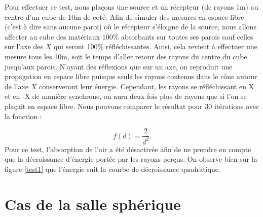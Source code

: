 Pour effectuer ce test, nous plaçons une source et un récepteur (de rayons 1m) au centre d'un cube de 10m de coté. Afin de simuler des mesures en espace libre (c'est à dire sans aucune paroi) où le récepteur s'éloigne de la source, nous allons affecter au cube des matériaux $100\%$ absorbants sur toutes ses parois sauf celles sur l'axe des $X$ qui seront 100\% réfléchissantes. Ainsi, cela revient à effectuer une mesure tous les 10m, soit le temps d'aller retour des rayons du centre du cube jusqu'aux parois. N'ayant des réflexions que sur un axe, on reproduit une propagation en espace libre puisque seuls les rayons contenus dans le cône autour de l'axe $X$ conserveront leur énergie. Cependant, les rayons se réfléchissant en X et en -X de manière synchrone, on aura deux fois plus de rayons que si l'on se plaçait en espace libre. Nous pouvons comparer le résultat pour 30 itérations avec la fonction :

\begin{equation*}
f(d) = \frac{2}{d^2}.
\end{equation*}
Pour ce test, l'absorption de l'air a été désactivée afin de ne prendre en compte que la décroissance d'énergie portée par les rayons perçus. On observe bien sur la figure \ref{test1} que l'énergie suit la courbe de décroissance quadratique.
 		
		
\section{Cas de la salle sphérique}

